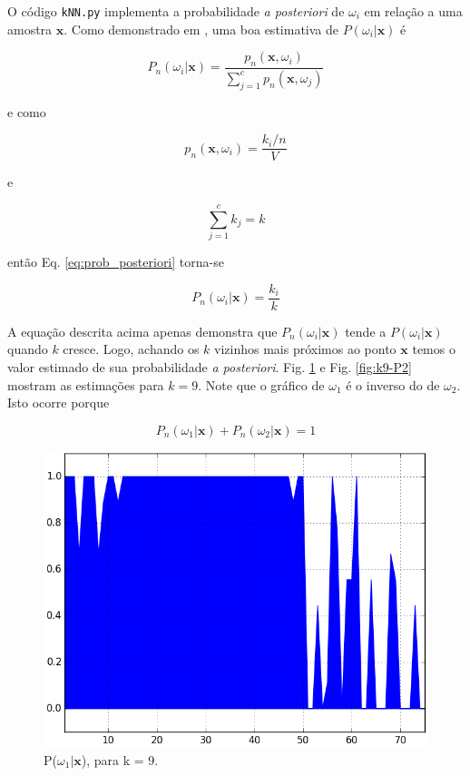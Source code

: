 \documentclass[12pt,twoside]{report}
\newcommand{\figureref}[1]{Fig. \ref{fig:#1}}
\newcommand{\equationref}[1]{Eq. \ref{eq:#1}}
\newcommand{\captiontext}[1]{\small{#1}}
\newcommand{\code}[1]{\texttt{#1}}
\begin{document}
O código \code{kNN.py} implementa a probabilidade \emph{a posteriori} de $\omega_i$
em relação a uma amostra $\mathbf{x}$. Como demonstrado em \autocite{duda.hart.stork.2000},
uma boa estimativa de $P(\omega_i|\mathbf{x})$ é

\begin{equation}
P_n(\omega_i|\mathbf{x}) = \frac{p_n(\mathbf{x}, \omega_i)}{\sum_{j=1}^c p_n(\mathbf{x}, \omega_j)}
\label{eq:prob_posteriori}
\end{equation}

\noindent e como

\begin{equation}
p_n(\mathbf{x}, \omega_i) = \frac{k_i / n}{V}
\label{eq:dens_prob_conjunta}
\end{equation}

\noindent e

\begin{equation}
\sum_{j=1}^c k_j = k
\label{eq:sum_k_i}
\end{equation}

\noindent então \equationref{prob_posteriori} torna-se

\begin{equation}
P_n(\omega_i|\mathbf{x}) = \frac{k_i}{k}
\label{eq:prob_posteriori_2}
\end{equation}

A equação descrita acima apenas demonstra que $P_n(\omega_i|\mathbf{x})$ tende a
$P(\omega_i|\mathbf{x})$ quando $k$ cresce. Logo, achando os $k$ vizinhos mais
próximos ao ponto $\mathbf{x}$ temos o valor estimado de sua probabilidade
\emph{a posteriori}. \figureref{k9-P1} e \figureref{k9-P2}
mostram as estimações para $k = 9$. Note que o gráfico de $\omega_1$ é o inverso
do de $\omega_2$. Isto ocorre porque

\begin{equation}
P_n(\omega_1|\mathbf{x}) + P_n(\omega_2|\mathbf{x}) = 1
\label{eq:sum_prob_posteriori}
\end{equation}

\begin{figure}[H]
    \centering
    \includegraphics[scale=0.5]{k9-P1}
    \caption{\captiontext{P($\omega_1|\mathbf{x}$), para k = 9.}}
    \label{fig:k9-P1}
\end{figure}
\end{document}
